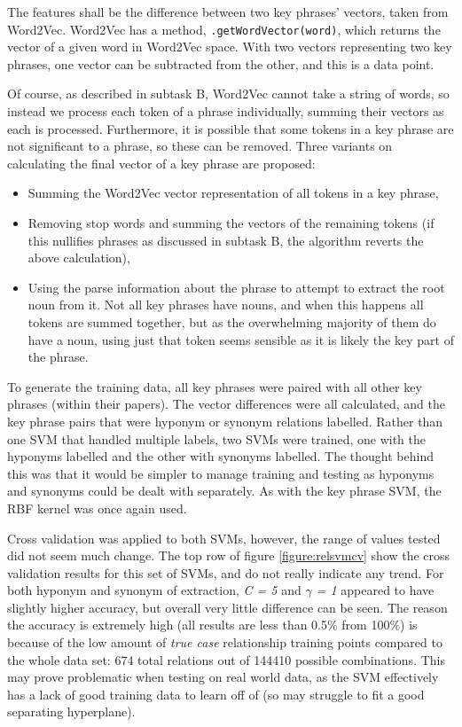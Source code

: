 The features shall be the difference between two key phrases' vectors, taken from Word2Vec. Word2Vec has a method, \texttt{.getWordVector(word)}, which returns the vector of a given word in Word2Vec space. With two vectors representing two key phrases, one vector can be subtracted from the other, and this is a data point.

Of course, as described in subtask B, Word2Vec cannot take a string of words, so instead we process each token of a phrase individually, summing their vectors as each is processed. Furthermore, it is possible that some tokens in a key phrase are not significant to a phrase, so these can be removed. Three variants on calculating the final vector of a key phrase are proposed:
\begin{itemize}
	\item Summing the Word2Vec vector representation of all tokens in a key phrase,
	\item Removing stop words and summing the vectors of the remaining tokens (if this nullifies phrases as discussed in subtask B, the algorithm reverts the above calculation),
	\item Using the parse information about the phrase to attempt to extract the root noun from it. Not all key phrases have nouns, and when this happens all tokens are summed together, but as the overwhelming majority of them do have a noun, using just that token seems sensible as it is likely the key part of the phrase.
\end{itemize}

To generate the training data, all key phrases were paired with all other key phrases (within their papers). The vector differences were all calculated, and the key phrase pairs that were hyponym or synonym relations labelled. Rather than one SVM that handled multiple labels, two SVMs were trained, one with the hyponyms labelled and the other with synonyms labelled. The thought behind this was that it would be simpler to manage training and testing as hyponyms and synonyms could be dealt with separately. As with the key phrase SVM, the RBF kernel was once again used.

Cross validation was applied to both SVMs, however, the range of values tested did not seem much change. The top row of figure \ref{figure:relsvmcv} show the cross validation results for this set of SVMs, and do not really indicate any trend. For both hyponym and synonym of extraction, \textit{C = 5} and \textit{$\gamma$ = 1} appeared to have slightly higher accuracy, but overall very little difference can be seen. The reason the accuracy is extremely high (all results are less than 0.5\% from 100\%) is because of the low amount of \textit{true case} relationship training points compared to the whole data set: 674 total relations out of 144410 possible combinations. This may prove problematic when testing on real world data, as the SVM effectively has a lack of good training data to learn off of (so may struggle to fit a good separating hyperplane).

